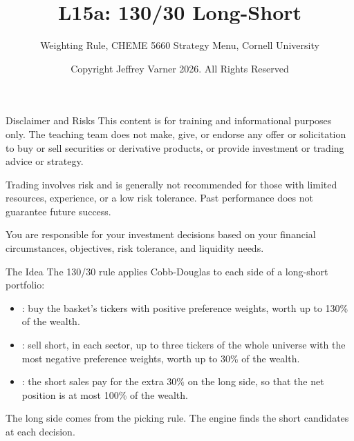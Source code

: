 \documentclass[aspectratio=169,11pt]{beamer}
\title{\texorpdfstring{{\vnheavy L15a}}{L15a}: 130/30 Long-Short}
\subtitle{Weighting Rule, CHEME 5660 Strategy Menu, Cornell University}
\author{Copyright Jeffrey Varner 2026. All Rights Reserved}
\begin{document}
\vntitlepage

\begin{frame}{Disclaimer and Risks}
  \vspace{0.6em}
  \textbf{} This content is for training and informational
  purposes only. The teaching team does not make, give, or endorse any offer or
  solicitation to buy or sell securities or derivative products, or provide
  investment or trading advice or strategy.

  \vspace{1.1em}
  \textbf{} Trading involves risk and is generally not recommended for
  those with limited resources, experience, or a low risk tolerance. Past
  performance does not guarantee future success.

  \vspace{1.1em}
  \textbf{} You are responsible for your investment decisions
  based on your financial circumstances, objectives, risk tolerance, and
  liquidity needs.
\end{frame}

\begin{frame}{The Idea}
  \vspace{0.3em}
  The 130/30 rule applies Cobb-Douglas to each side of a long-short portfolio:
  \begin{itemize}\setlength{\itemsep}{0.5em}
    \item {}: buy the basket's tickers with positive preference weights, worth up to 130\% of the wealth.
    \item {}: sell short, in each sector, up to three tickers of the whole universe with the most negative preference weights, worth up to 30\% of the wealth.
    \item {}: the short sales pay for the extra 30\% on the long side, so that the net position is at most 100\% of the wealth.
  \end{itemize}

  \vspace{0.5em}
  The long side comes from the picking rule. The engine finds the short candidates at each decision.
\end{frame}
\end{document}
